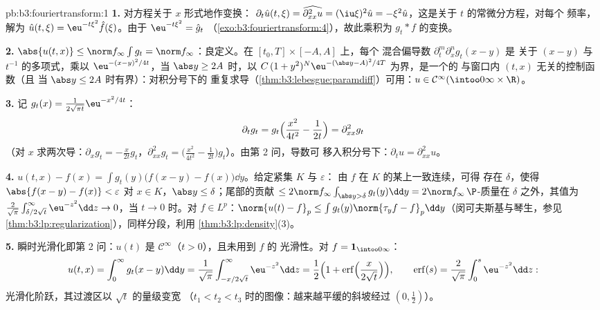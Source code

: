 \begin{solution}{pb:b3:fouriertransform:1}
\textbf{1.} 对方程关于 $x$ 形式地作变换：
$\partial_t\hat u(t,\xi) = \widehat{\partial^2_{xx}u} =
(\iu\xi)^2\hat u = -\xi^2\hat u$，这是关于 $t$ 的常微分方程，对每个
频率，解为 $\hat u(t,\xi) = \eu^{-t\xi^2}\hat f(\xi)$。由于
$\eu^{-t\xi^2} = \hat g_t$
（\cref{exo:b3:fouriertransform:4}），故此乘积为
$g_t * f$ 的变换。

\textbf{2.} $\abs{u(t,x)} \leq \norm f_\infty\int g_t = \norm
f_\infty$：良定义。在 $[t_0, T]\times[-A, A]$ 上，每个
混合偏导数 $\partial^m_t\partial^n_xg_t(x - y)$ 是
关于 $(x - y)$ 与 $t^{-1}$ 的多项式，乘以
$\eu^{-(x-y)^2/4t}$，当 $\abs y \geq 2A$ 时，以
$C\,(1 + y^2)^N\eu^{-(\abs y - A)^2/4T}$ 为界，是一个的
与窗口内 $(t, x)$ 无关的控制函数（且
当 $\abs y \leq 2A$ 时有界）：对积分号下的
重复求导（\cref{thm:b3:lebesgue:paramdiff}）可用：$u \in
\mathcal C^\infty(\intoo0\infty\times\R)$。

\textbf{3.} 记 $g_t(x) = \frac1{2\sqrt{\pi
t}}\eu^{-x^2/4t}$：
\[
\partial_tg_t = g_t\Bigl(\frac{x^2}{4t^2} - \frac1{2t}\Bigr)
= \partial^2_{xx}g_t
\]
（对 $x$ 求两次导：$\partial_xg_t = -\frac
x{2t}g_t$，$\partial^2_{xx}g_t = \bigl(\frac{x^2}{4t^2} -
\frac1{2t}\bigr)g_t$）。由第 2 问，导数可
移入积分号下：$\partial_tu = \partial^2_{xx}u$。

\textbf{4.} $u(t,x) - f(x) = \int g_t(y)\bigl(f(x - y) -
f(x)\bigr)\dd y$。给定紧集 $K$ 与 $\varepsilon$：
由 $f$ 在 $K$ 的某上一致连续，可得
存在 $\delta$，使得 $\abs{f(x-y) - f(x)} < \varepsilon$ 对 $x \in
K$，$\abs y \leq \delta$；尾部的贡献 $\leq 2\norm
f_\infty\int_{\abs y > \delta}g_t(y)\dd y = 2\norm
f_\infty\,\P$-质量在 $\delta$ 之外，其值为
$\frac2{\sqrt\pi}\int_{\delta/2\sqrt t}^\infty\eu^{-z^2}\dd z
\to 0$，当 $t \to 0$ 时。对 $f \in L^p$：$\norm{u(t) - f}_p \leq
\int g_t(y)\norm{\tau_yf - f}_p\dd y$（闵可夫斯基与琴生，参见
\cref{thm:b3:lp:regularization}），同样分段，利用
\cref{thm:b3:lp:density}(3)。

\textbf{5.} 瞬时光滑化即第 2 问：$u(t)$ 是
$\mathcal C^\infty$（$t > 0$），且未用到 $f$ 的
光滑性。对 $f = \mathbf 1_{\intoo0\infty}$：
\[
u(t, x) = \int_0^\infty g_t(x - y)\dd y
= \frac1{\sqrt\pi}\int_{-x/2\sqrt t}^{\infty}\eu^{-z^2}\dd z
= \frac12\Bigl(1 +
\operatorname{erf}\Bigl(\frac{x}{2\sqrt t}\Bigr)\Bigr),
\qquad \operatorname{erf}(s) =
\frac2{\sqrt\pi}\int_0^s\eu^{-z^2}\dd z :
\]
光滑化阶跃，其过渡区以 $\sqrt t$ 的量级变宽
（$t_1 < t_2 < t_3$ 时的图像：越来越平缓的斜坡经过
$(0, \frac12)$）。


\end{solution}
